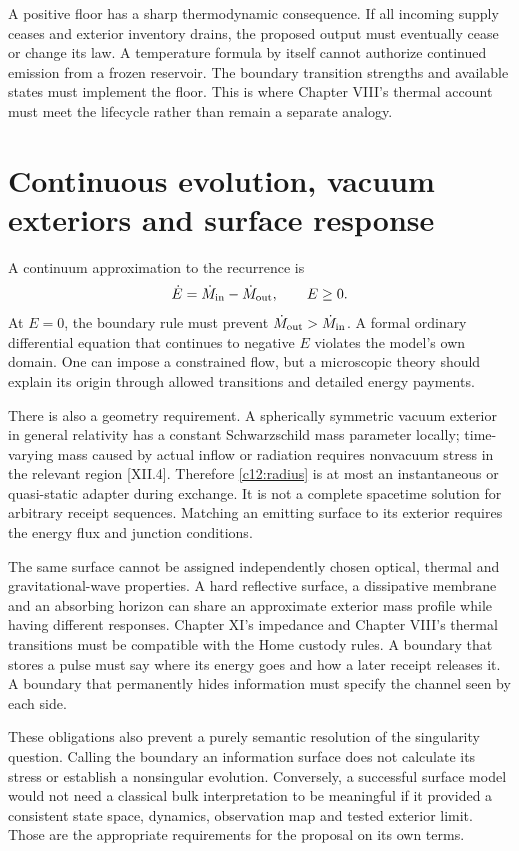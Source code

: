 A positive floor has a sharp thermodynamic consequence. If all incoming supply ceases and exterior inventory drains, the proposed output must eventually cease or change its law. A temperature formula by itself cannot authorize continued emission from a frozen reservoir. The boundary transition strengths and available states must implement the floor. This is where Chapter VIII's thermal account must meet the lifecycle rather than remain a separate analogy.

\section{Continuous evolution, vacuum exteriors and surface response}
A continuum approximation to the recurrence is
\begin{equation}
 \dot E=\dot M_{\rm in}-\dot M_{\rm out},\qquad E\geq0.
 \label{c12:continuous}
\end{equation}
At $E=0$, the boundary rule must prevent $\dot M_{\rm out}>\dot M_{\rm in}$. A formal ordinary differential equation that continues to negative $E$ violates the model's own domain. One can impose a constrained flow, but a microscopic theory should explain its origin through allowed transitions and detailed energy payments.

There is also a geometry requirement. A spherically symmetric vacuum exterior in general relativity has a constant Schwarzschild mass parameter locally; time-varying mass caused by actual inflow or radiation requires nonvacuum stress in the relevant region [XII.4]. Therefore \eqref{c12:radius} is at most an instantaneous or quasi-static adapter during exchange. It is not a complete spacetime solution for arbitrary receipt sequences. Matching an emitting surface to its exterior requires the energy flux and junction conditions.

The same surface cannot be assigned independently chosen optical, thermal and gravitational-wave properties. A hard reflective surface, a dissipative membrane and an absorbing horizon can share an approximate exterior mass profile while having different responses. Chapter XI's impedance and Chapter VIII's thermal transitions must be compatible with the Home custody rules. A boundary that stores a pulse must say where its energy goes and how a later receipt releases it. A boundary that permanently hides information must specify the channel seen by each side.

These obligations also prevent a purely semantic resolution of the singularity question. Calling the boundary an information surface does not calculate its stress or establish a nonsingular evolution. Conversely, a successful surface model would not need a classical bulk interpretation to be meaningful if it provided a consistent state space, dynamics, observation map and tested exterior limit. Those are the appropriate requirements for the proposal on its own terms.

